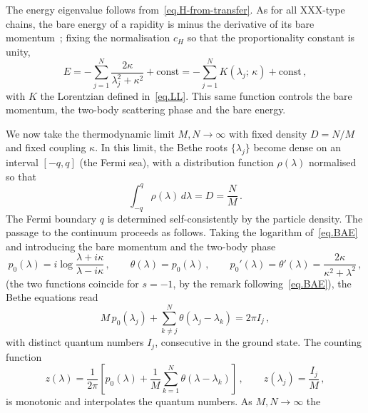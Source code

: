 \documentclass[11pt,a4paper]{article}
\theoremstyle{definition}
\begin{document}
The energy eigenvalue follows from~\eqref{eq.H-from-transfer}.  As for all
XXX-type chains, the bare energy of a rapidity is minus the derivative of its
bare momentum~\cite{TarasovTakhtajanFaddeev1983, KorepinBogoliubovIzergin1993};
fixing the normalisation $c_H$ so that the proportionality constant is unity,
\begin{equation}\label{eq.energy-eigenvalue}
  E = -\sum_{j=1}^{N}\frac{2\kappa}{\lambda_j^2 + \kappa^2}
  + \text{const}
  = -\sum_{j=1}^{N} K(\lambda_j;\,\kappa) + \text{const}\,,
\end{equation}
with $K$ the Lorentzian defined in~\eqref{eq.LL}.  This same
function controls the bare momentum, the two-body scattering phase
and the bare energy.

We now take the thermodynamic limit $M, N \to \infty$ with fixed
density $D = N/M$ and fixed coupling $\kappa$.  In this limit, the
Bethe roots $\{\lambda_j\}$ become dense on an interval $[-q, q]$
(the Fermi sea), with a distribution function $\rho(\lambda)$
normalised so that
\begin{equation}\label{eq.density-normalisation}
  \int_{-q}^{q}\rho(\lambda)\,d\lambda = D = \frac{N}{M}\,.
\end{equation}
The Fermi boundary $q$ is determined self-consistently by the particle
density.
The passage to the continuum proceeds as follows.  Taking the logarithm
of~\eqref{eq.BAE} and introducing the bare momentum and the two-body phase
\begin{equation}\label{eq.bare-phase}
  p_0(\lambda) = i\log\frac{\lambda + i\kappa}{\lambda - i\kappa}\,,
  \qquad
  \theta(\lambda) = p_0(\lambda)\,,
  \qquad
  p_0'(\lambda) = \theta'(\lambda) = \frac{2\kappa}{\kappa^2+\lambda^2}\,,
\end{equation}
(the two functions coincide for $s=-1$, by the remark following~\eqref{eq.BAE}),
the Bethe equations read
\begin{equation}\label{eq.BAE-log}
  M\,p_0(\lambda_j) + \sum_{k \neq j}^{N}\theta(\lambda_j - \lambda_k)
  = 2\pi I_j\,,
\end{equation}
with distinct quantum numbers $I_j$, consecutive in the ground state.  The
counting function
\begin{equation}\label{eq.counting-function}
  z(\lambda) = \frac{1}{2\pi}\left[p_0(\lambda)
  + \frac{1}{M}\sum_{k=1}^{N}\theta(\lambda - \lambda_k)\right]\,,
  \qquad z(\lambda_j) = \frac{I_j}{M}\,,
\end{equation}
is monotonic and interpolates the quantum numbers.  As $M, N \to \infty$ the
\end{document}
